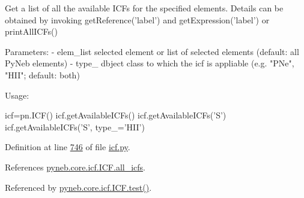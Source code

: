 \begin{DoxyVerb}Get a list of all the available ICFs for the specified elements. 
Details can be obtained by invoking getReference('label') and getExpression('label') or printAllICFs()

Parameters:
    - elem_list    selected element or list of selected elements (default: all PyNeb elements)
    - type_         dbject class to which the icf is appliable (e.g. "PNe", "HII"; default: both)

Usage:

icf=pn.ICF()
icf.getAvailableICFs()
icf.getAvailableICFs('S')
icf.getAvailableICFs('S', type_='HII')\end{DoxyVerb}
 

Definition at line \hyperlink{icf_8py_source_l00746}{746} of file \hyperlink{icf_8py_source}{icf.\-py}.



References \hyperlink{icf_8py_source_l00023}{pyneb.\-core.\-icf.\-I\-C\-F.\-all\-\_\-icfs}.



Referenced by \hyperlink{icf_8py_source_l01114}{pyneb.\-core.\-icf.\-I\-C\-F.\-test()}.


